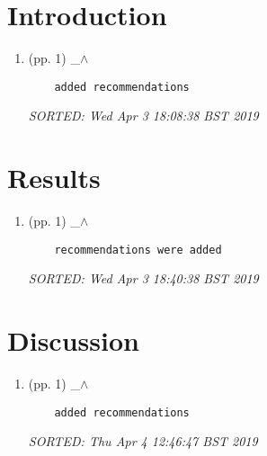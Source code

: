 \documentclass[12pt]{article}
\begin{document}
\section{Introduction}


\begin{enumerate}

\item  (pp. 1)  \_$\wedge$  

	\begin{verbatim}
	added recommendations 	
	\end{verbatim}
	\textit{
	SORTED:  Wed Apr  3 18:08:38 BST 2019
	}
	\\


\end{enumerate}



\section{Results}


\begin{enumerate}

\item  (pp. 1)  \_$\wedge$  

	\begin{verbatim}
	recommendations were added	
	\end{verbatim}
	\textit{
	SORTED:  Wed Apr  3 18:40:38 BST 2019
	}
	\\


\end{enumerate}





\section{Discussion}


\begin{enumerate}

\item  (pp. 1)  \_$\wedge$  

	\begin{verbatim}
 	added recommendations	
	\end{verbatim}
	\textit{
	SORTED:  Thu Apr  4 12:46:47 BST 2019
	}
	\\


\end{enumerate}
\end{document}
